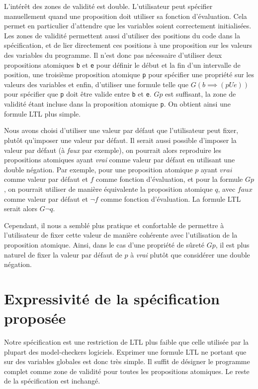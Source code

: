 L'intérêt des zones de validité est double. L'utilisateur peut spécifier
manuellement quand une proposition doit utiliser sa fonction d'évaluation. Cela
permet en particulier d'attendre que les variables soient correctement
initialisées. Les zones de validité permettent aussi d'utiliser des positions
du code dans la spécification, et de lier directement ces positions à une
proposition sur les valeurs des variables du programme. Il n'est donc pas
nécessaire d'utiliser deux propositions atomiques \texttt{b} et \texttt{e} pour
définir le début et la fin d'un intervalle de position, une troisième
proposition atomique \texttt{p} pour spécifier une propriété sur les valeurs des
variables et enfin, d'utiliser une formule telle que \(G (b \implies (p U e))\)
pour spécifier que \texttt{p} doit être valide entre \texttt{b} et \texttt{e}.
\(G p\) est suffisant, la zone de validité étant incluse dans la proposition
atomique \texttt{p}. On obtient ainsi une formule LTL plus simple.

Nous avons choisi d'utiliser une valeur par défaut que l'utilisateur peut fixer,
plutôt qu'imposer une valeur par défaut. Il serait aussi possible d'imposer la
valeur par défaut (à \emph{faux} par exemple), on pourrait alors
reproduire les propositions atomiques ayant \emph{vrai} comme valeur par
défaut en utilisant une double négation. Par exemple, pour une proposition
atomique \(p\) ayant \(vrai\) comme valeur par défaut et \(f\) comme fonction
d'évaluation, et pour la formule \(G p\), on pourrait utiliser de manière
équivalente la proposition atomique \(q\), avec \(faux\) comme valeur par défaut
et \(\lnot f\) comme fonction d'évaluation. La formule LTL serait alors \(G
\lnot q\).

Cependant, il nous a semblé plus pratique et confortable de permettre à
l'utilisateur de fixer cette valeur de manière cohérente avec
l'utilisation de la proposition atomique. Ainsi, dans le
cas d'une propriété de sûreté \(G p\), il est plus naturel de fixer la
valeur par défaut de \(p\) à \emph{vrai} plutôt que considérer une
double négation.

\section{Expressivité de la spécification proposée}

Notre spécification est une restriction de \ac{LTL} plus faible que celle utilisée
par la plupart des model-checkers logiciels. Exprimer une formule \ac{LTL} ne
portant que sur des variables globales est donc très simple. Il suffit de
désigner le programme complet comme zone de validité pour toutes les
propositions atomiques. Le reste de la spécification est inchangé.

